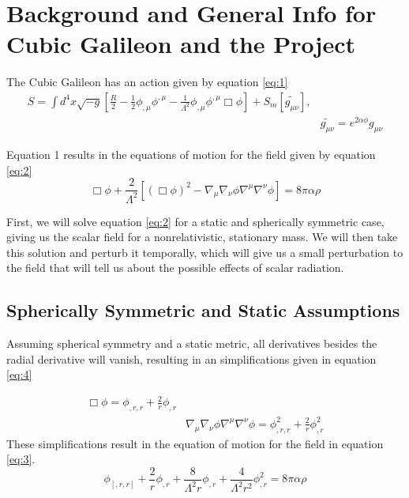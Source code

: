 \documentclass[12pt,a4paper]{article} %
\newcommand\BackgroundStructure{ %
\setlength{\unitlength}{1mm} %



\setlength\fboxsep{0mm} %
\setlength\fboxrule{0.5mm} %
\put(10, 10){\fcolorbox{black}{blue!10}{\framebox(155,247){}}} %
\put(165, 10){\fcolorbox{black}{blue!10}{\framebox(37,247){}}} %
\put(10, 262){\fcolorbox{black}{white!10}{\framebox(192, 25){}}} %
}
\begin{document}


\section{Background and General Info for Cubic Galileon and the Project} 

The Cubic Galileon has an action given by equation \ref{eq:1}
\begin{equation}\label{eq:1}
\begin{split}
S = \int d^4x \sqrt{-g} [\frac{R}{2}- \frac{1}{2} \phi_{,\mu} \phi^{,\mu} - \frac{1}{\Lambda^2} \phi_{,\mu} \phi^{,\mu} \Box \phi] + S_m[\tilde{g_{\mu \nu}}], \\
& \tilde{g_{\mu \nu}} = e^{2 \alpha \phi} g_{\mu \nu}
\end{split}
\end{equation}
 
Equation 1 results in the equations of motion for the field given by equation \ref{eq:2}
\begin{equation}\label{eq:2}
\Box \phi + \frac{2}{\Lambda^2} [ (\Box \phi)^2 -\nabla_{\mu}\nabla_{\nu}\phi\nabla^{\mu}\nabla^{\nu}\phi] = 8 \pi \alpha \rho
\end{equation}

First, we will solve equation \ref{eq:2} for a static and spherically symmetric case, giving us the scalar field for a nonrelativistic, stationary mass. We will then take this solution and perturb it temporally, which will give us a small perturbation to the field that will tell us about the possible effects of scalar radiation. 
\subsection{Spherically Symmetric and Static Assumptions}
Assuming spherical symmetry and a static metric, all derivatives besides the radial derivative will vanish, resulting in an simplifications given in equation \ref{eq:4}

\begin{equation}\label{eq:4}
\begin{split}
\Box \phi = \phi_{,r,r} + \frac{2}{r}\phi_{,r} \\
& \nabla_{\mu}\nabla_{\nu}\phi\nabla^{\mu}\nabla^{\nu}\phi = \phi_{,r,r}^2 + \frac{2}{r} \phi_{,r}^2
\end{split}
\end{equation}
These simplifications result in the equation of motion for the field in equation \ref{eq:3}.
\begin{equation}\label{eq:3}
\phi_[,r,r] + \frac{2}{r} \phi_{,r} + \frac{8}{\Lambda^2 r}\phi_{,r} + \frac{4}{\Lambda^2 r^2}\phi_{,r}^2 = 8 \pi \alpha \rho
\end{equation}
\end{document}
